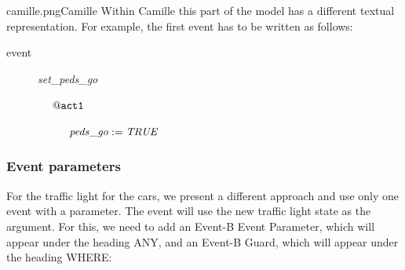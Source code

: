 \newcommand{\CamilleEVT}[1]{  \item[\textcolor{keycolor}{event }] \textit{#1} \paraSpc } 
\newcommand{\CamillenItemX}[2]{ \item[\textcolor{labelcolor}{$\tt ~~~~@#1$}] \textcolor{xcodecolor}{$\it #2$} \itemSpc } %
\begin{rodin-plugin}{camille.png}{Camille}
Within Camille this part of the model has a different textual representation.
For example, the first event has to be written as follows:

\begin{description}
	\CamilleEVT {set\_peds\_go}
		\begin{description}
		\BeginAct
			\begin{description}
			     \CamillenItemX{ act1 }{ peds\_go :=  TRUE }
			\end{description}
		\EndAct
		\end{description}
\end{description}

\end{rodin-plugin}

\subsubsection{Event parameters}

For the traffic light for the cars, we present a different approach and use only one event with a parameter.  The event will use the new traffic light state as the argument. For this, we need to add an Event-B Event Parameter, which will appear under the heading \textsf{ANY}, and an Event-B Guard, which will appear under the heading \textsf{WHERE}: 


